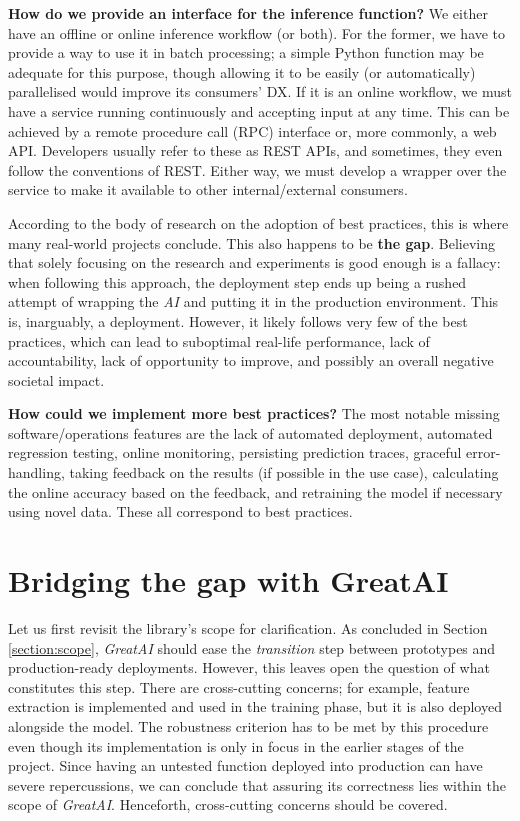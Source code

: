\begin{displayquote}
\textbf{How do we provide an interface for the inference function?} We either have an offline or online inference workflow (or both). For the former, we have to provide a way to use it in batch processing; a simple Python function may be adequate for this purpose, though allowing it to be easily (or automatically) parallelised would improve its consumers' DX. If it is an online workflow, we must have a service running continuously and accepting input at any time. This can be achieved by a remote procedure call (RPC) interface or, more commonly, a web API. Developers usually refer to these as REST APIs, and sometimes, they even follow the conventions of REST. Either way, we must develop a wrapper over the service to make it available to other internal/external consumers.
\end{displayquote}

According to the body of research on the adoption of best practices, this is where many real-world projects conclude. This also happens to be \textbf{the gap}. Believing that solely focusing on the research and experiments is good enough is a fallacy: when following this approach, the deployment step ends up being a rushed attempt of wrapping the \textit{AI} and putting it in the production environment. This is, inarguably, a deployment. However, it likely follows very few of the best practices, which can lead to suboptimal real-life performance, lack of accountability, lack of opportunity to improve, and possibly an overall negative societal impact.

\begin{displayquote}
\textbf{How could we implement more best practices?} The most notable missing software/operations features are the lack of automated deployment, automated regression testing, online monitoring, persisting prediction traces, graceful error-handling, taking feedback on the results (if possible in the use case), calculating the online accuracy based on the feedback, and retraining the model if necessary using novel data. These all correspond to best practices.
\end{displayquote}

\section{Bridging the gap with GreatAI}

Let us first revisit the library's scope for clarification. As concluded in Section \ref{section:scope}, \textit{GreatAI} should ease the \textit{transition} step between prototypes and production-ready deployments. However, this leaves open the question of what constitutes this step. There are cross-cutting concerns; for example, feature extraction is implemented and used in the training phase, but it is also deployed alongside the model. The robustness criterion has to be met by this procedure even though its implementation is only in focus in the earlier stages of the project. Since having an untested function deployed into production can have severe repercussions, we can conclude that assuring its correctness lies within the scope of \textit{GreatAI}. Henceforth, cross-cutting concerns should be covered.

